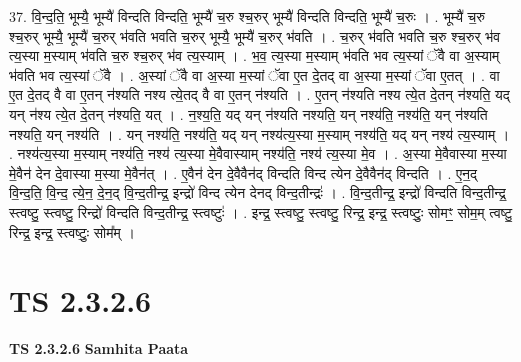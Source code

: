 \documentclass[17pt]{extarticle}
\begin{document}
37. वि॒न्द॒ति॒ भूम्यै॒ भूम्यै॑ विन्दति विन्दति॒ भूम्यै॑ च॒रु श्च॒रुर् भूम्यै॑ विन्दति विन्दति॒ भूम्यै॑ च॒रुः । . भूम्यै॑ च॒रु श्च॒रुर् भूम्यै॒ भूम्यै॑ च॒रुर् भ॑वति भवति च॒रुर् भूम्यै॒ भूम्यै॑ च॒रुर् भ॑वति । . च॒रुर् भ॑वति भवति च॒रु श्च॒रुर् भ॑व त्य॒स्या म॒स्याम् भ॑वति च॒रु श्च॒रुर् भ॑व त्य॒स्याम् । . भ॒व॒ त्य॒स्या म॒स्याम् भ॑वति भव त्य॒स्यां ॅवै वा अ॒स्याम् भ॑वति भव त्य॒स्यां ॅवै । . अ॒स्यां ॅवै वा अ॒स्या म॒स्यां ॅवा ए॒त दे॒तद् वा अ॒स्या म॒स्यां ॅवा ए॒तत् । . वा ए॒त दे॒तद् वै वा ए॒तन् न॑श्यति नश्य त्ये॒तद् वै वा ए॒तन् न॑श्यति । . ए॒तन् न॑श्यति नश्य त्ये॒त दे॒तन् न॑श्यति॒ यद् यन् न॑श्य त्ये॒त दे॒तन् न॑श्यति॒ यत् । . न॒श्य॒ति॒ यद् यन् न॑श्यति नश्यति॒ यन् नश्य॑ति॒ नश्य॑ति॒ यन् न॑श्यति नश्यति॒ यन् नश्य॑ति । . यन् नश्य॑ति॒ नश्य॑ति॒ यद् यन् नश्य॑त्य॒स्या म॒स्याम् नश्य॑ति॒ यद् यन् नश्य॑ त्य॒स्याम् । . नश्य॑त्य॒स्या म॒स्याम् नश्य॑ति॒ नश्य॑ त्य॒स्या मे॒वैवास्याम् नश्य॑ति॒ नश्य॑ त्य॒स्या मे॒व । . अ॒स्या मे॒वैवास्या म॒स्या मे॒वैन॑ देन दे॒वास्या म॒स्या मे॒वैन॑त् । . ए॒वैन॑ देन दे॒वैवैन॑द् विन्दति विन्द त्येन दे॒वैवैन॑द् विन्दति । . ए॒न॒द् वि॒न्द॒ति॒ वि॒न्द॒ त्ये॒न॒ दे॒न॒द् वि॒न्द॒तीन्द्र॒ इन्द्रो॑ विन्द त्येन देनद् विन्द॒तीन्द्रः॑ । . वि॒न्द॒तीन्द्र॒ इन्द्रो॑ विन्दति विन्द॒तीन्द्र॒ स्त्वष्टु॒ स्त्वष्टु॒ रिन्द्रो॑ विन्दति विन्द॒तीन्द्र॒ स्त्वष्टुः॑ । . इन्द्र॒ स्त्वष्टु॒ स्त्वष्टु॒ रिन्द्र॒ इन्द्र॒ स्त्वष्टुः॒ सोमꣳ॒॒ सोम॒म् त्वष्टु॒ रिन्द्र॒ इन्द्र॒ स्त्वष्टुः॒ सोम᳚म् । \newline
\pagebreak
{}
\section*{ TS 2.3.2.6 }

\textbf{TS 2.3.2.6 } \newline
\textbf{Samhita Paata} \newline
\end{document}
